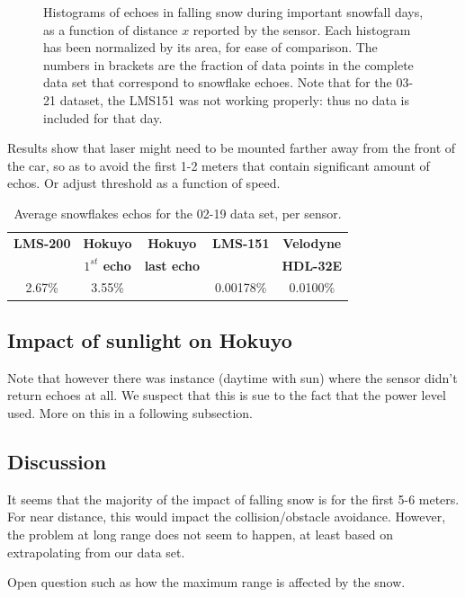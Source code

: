 \begin{figure}[th]
    \caption{Histograms of echoes in falling snow during important snowfall days, as a function of distance $x$ reported by the sensor. Each histogram has been normalized by its area, for ease of comparison. The numbers in brackets are the fraction of data points in the complete data set that correspond to snowflake echoes. Note that for the 03-21 dataset, the LMS151 was not working properly: thus no data is included for that day.}
    \label{fig:Histograms}
\end{figure}

Results show that laser might need to be mounted farther away from the front of the car, so as to avoid the first 1-2 meters that contain significant amount of echos. Or adjust threshold as a function of speed.

\begin{table}[htbp]
    \centering
    \begin{tabular}{|c|c|c|c|c|}
        \hline
        \textbf{LMS-200}       & \textbf{Hokuyo}             & \textbf{Hokuyo}    & \textbf{LMS-151}  & \textbf{Velodyne}  \\
                                        & \textbf{$1^{st}$ echo}   & \textbf{last echo}  &                            & \textbf{HDL-32E}  \\\hline
                 2.67\%            &           3.55\%                &                                      &       0.00178\%     &  0.0100\%  \\\hline
    \end{tabular}
    \caption{Average snowflakes echos for the 02-19 data set, per sensor.}
    \label{tab:avgRates}
\end{table}

\subsection{Impact of sunlight on Hokuyo}

Note that however there was instance (daytime with sun) where the sensor didn't return echoes at all. We suspect that this is sue to the fact that the power level used. More on this in a following subsection.

\subsection{Discussion}
It seems that the majority of the impact of falling snow is for the first 5-6 meters. For near distance, this would impact the collision/obstacle avoidance. However, the problem at long range does not seem to happen, at least based on extrapolating from our data set.

Open question such as how the maximum range is affected by the snow.

